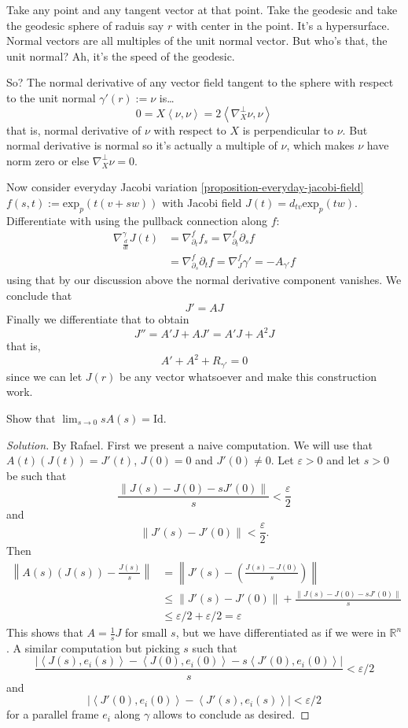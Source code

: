 Take any point and any tangent vector at that point. Take the geodesic and take
the geodesic sphere of raduis say $r$ with center in the point. It's
a hypersurface. Normal vectors are all multiples of the unit normal vector. But
who's that, the unit normal? Ah, it's the speed of the geodesic.

So? The normal derivative of any vector field tangent to the sphere with respect
to the unit normal $\gamma'(r):=\nu$ is…
$$
0=X\left<\nu,\nu\right>=2\left<\nabla^\perp_X \nu,\nu\right>
$$
that is, normal derivative of $\nu$ with respect to $X$ is perpendicular to
$\nu$. But normal derivative is normal so it's actually a multiple of $\nu$, 
which makes $\nu$ have norm zero or else $\nabla^\perp_X \nu=0$.

Now consider everyday Jacobi variation \ref{proposition-everyday-jacobi-field}
 $f(s,t):=\text{exp}_p(t(v+sw))$ with Jacobi field
$J(t)=d_{tv}\text{exp}_p(tw)$. Differentiate with using the pullback connection
along $f$:
\begin{align*}
\nabla_{\frac{d}{dt}}^\gamma
J(t)&=\nabla_{\partial_t}^ff_s=\nabla_{\partial_t}^f \partial_sf\\
&=\nabla_{\partial_s}^f \partial_t f=\nabla_{J}^f \gamma' = -A_{\gamma'}f
\end{align*}
using that by our discussion above the normal derivative component vanishes. We
conclude that
\begin{equation}
\label{equation-Jacobi-field-derivative-is-shape-operator}
J'=AJ
\end{equation}
Finally we differentiate that to obtain
$$
J''=A'J+AJ'=A'J+A^2J
$$
that is,
\begin{equation}
\label{equation-Riccati}
A'+A^2+R_{\gamma'}=0
\end{equation}
since we can let $J(r)$ be any vector whatsoever and make this construction
work.
\begin{exercise}
\label{exercise-limit-of-shape-operator}
Show that $\lim_{s\to0}sA(s)=\text{Id}$.
\end{exercise}

\begin{proof}[Solution]
By Rafael. First we present a naive computation. We will use that
$A(t)(J(t))=J'(t)$,  $J(0)=0$ and $J'(0)\neq 0$. Let $\varepsilon>0$ and let
$s>0$ be such that
$$
\frac{\|J(s)-J(0)-sJ'(0)\|}{s}<\frac{\varepsilon}{2}
$$
and
$$
\|J'(s)-J'(0)\|<\frac{\varepsilon}{2}.
$$
Then
\begin{align*}
\left\|A(s)(J(s))-\frac{J(s)}{s}\right\|&
=\left\|J'(s)-\left(\frac{J(s)-J(0)}{s}\right)\right\|\\
&\leq \|J'(s)-J'(0)\|+\frac{\|J(s)-J(0)-sJ'(0)\|}{s}\\
&\leq\varepsilon/2+\varepsilon/2=\varepsilon
\end{align*}
This shows that $A=\frac{1}{s}J$ for small $s$, but we have differentiated as if
we were in $\mathbb{R}^n$. A similar computation but picking $s$ such that
$$
\frac{|\left<J(s),e_i(s)\right>-\left<J(0),e_i(0)\right>
-s\left<J'(0),e_i(0)\right>|}{s}<\varepsilon/2
$$
and
$$
|\left<J'(0),e_i(0)\right>-\left<J'(s),e_i(s)\right>|<\varepsilon/2
$$
for a parallel frame $e_i$ along $\gamma$ allows to conclude as desired.
\end{proof}

